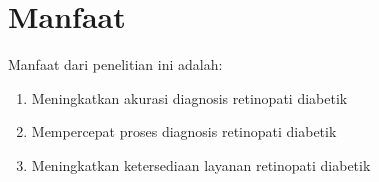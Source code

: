 \section{Manfaat}

Manfaat dari penelitian ini adalah:
\begin{enumerate}
    \item Meningkatkan akurasi diagnosis retinopati diabetik
    \item Mempercepat proses diagnosis retinopati diabetik
    \item Meningkatkan ketersediaan layanan retinopati diabetik
\end{enumerate}

